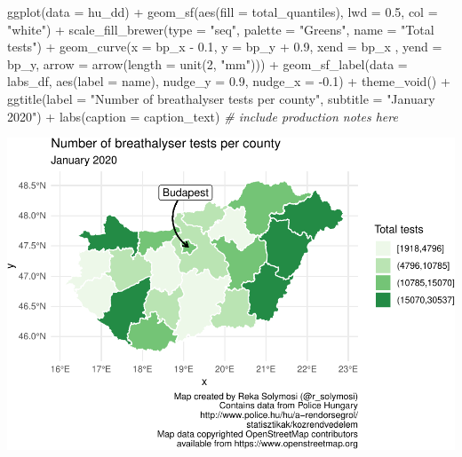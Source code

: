 \documentclass[
]{book}
\makeatletter
\newenvironment{Shaded}{\begin{snugshade}}{\end{snugshade}}
\newcommand{\AttributeTok}[1]{\textcolor[rgb]{0.61,0.61,0.61}{#1}}
\newcommand{\CommentTok}[1]{\textcolor[rgb]{0.37,0.37,0.37}{\textit{#1}}}
\newcommand{\DecValTok}[1]{\textcolor[rgb]{0.06,0.06,0.06}{#1}}
\newcommand{\FloatTok}[1]{\textcolor[rgb]{0.06,0.06,0.06}{#1}}
\newcommand{\FunctionTok}[1]{\textcolor[rgb]{0,0,0}{#1}}
\newcommand{\NormalTok}[1]{#1}
\newcommand{\SpecialCharTok}[1]{\textcolor[rgb]{0,0,0}{#1}}
\newcommand{\StringTok}[1]{\textcolor[rgb]{0.5,0.5,0.5}{#1}}
\newenvironment{kframe}{%
\medskip{}
\setlength{\fboxsep}{.8em}
 \def\at@end@of@kframe{}%
 \ifinner\ifhmode%
  \def\at@end@of@kframe{\end{minipage}}%
  \begin{minipage}{\columnwidth}%
 \fi\fi%
 \def\FrameCommand##1{\hskip\@totalleftmargin \hskip-\fboxsep
 \colorbox{shadecolor}{##1}\hskip-\fboxsep
     \hskip-\linewidth \hskip-\@totalleftmargin \hskip\columnwidth}%
 \MakeFramed {\advance\hsize-\width
   \@totalleftmargin\z@ \linewidth\hsize
   \@setminipage}}%
 {\par\unskip\endMakeFramed%
 \at@end@of@kframe}
\renewenvironment{Shaded}{\begin{kframe}}{\end{kframe}}
\makeatother
\begin{document}
\begin{Shaded}
\begin{Highlighting}[]
\FunctionTok{ggplot}\NormalTok{(}\AttributeTok{data =}\NormalTok{ hu\_dd) }\SpecialCharTok{+} 
  \FunctionTok{geom\_sf}\NormalTok{(}\FunctionTok{aes}\NormalTok{(}\AttributeTok{fill =}\NormalTok{ total\_quantiles), }
          \AttributeTok{lwd =} \FloatTok{0.5}\NormalTok{, }\AttributeTok{col =} \StringTok{"white"}\NormalTok{) }\SpecialCharTok{+} 
  \FunctionTok{scale\_fill\_brewer}\NormalTok{(}\AttributeTok{type =} \StringTok{"seq"}\NormalTok{, }
                    \AttributeTok{palette =} \StringTok{"Greens"}\NormalTok{, }
                    \AttributeTok{name =} \StringTok{"Total tests"}\NormalTok{) }\SpecialCharTok{+} 
  \FunctionTok{geom\_curve}\NormalTok{(}\AttributeTok{x =}\NormalTok{ bp\_x }\SpecialCharTok{{-}} \FloatTok{0.1}\NormalTok{, }
             \AttributeTok{y =}\NormalTok{ bp\_y }\SpecialCharTok{+} \FloatTok{0.9}\NormalTok{, }
             \AttributeTok{xend =}\NormalTok{ bp\_x , }
             \AttributeTok{yend =}\NormalTok{ bp\_y, }
             \AttributeTok{arrow =} \FunctionTok{arrow}\NormalTok{(}\AttributeTok{length =} \FunctionTok{unit}\NormalTok{(}\DecValTok{2}\NormalTok{, }\StringTok{"mm"}\NormalTok{))) }\SpecialCharTok{+}
  \FunctionTok{geom\_sf\_label}\NormalTok{(}\AttributeTok{data =}\NormalTok{ labs\_df, }
                \FunctionTok{aes}\NormalTok{(}\AttributeTok{label =}\NormalTok{ name), }
                \AttributeTok{nudge\_y =} \FloatTok{0.9}\NormalTok{, }
                \AttributeTok{nudge\_x =} \SpecialCharTok{{-}}\FloatTok{0.1}\NormalTok{) }\SpecialCharTok{+} 
  \FunctionTok{theme\_void}\NormalTok{() }\SpecialCharTok{+} 
  \FunctionTok{ggtitle}\NormalTok{(}\AttributeTok{label =} \StringTok{"Number of breathalyser tests per county"}\NormalTok{, }
          \AttributeTok{subtitle =} \StringTok{"January 2020"}\NormalTok{) }\SpecialCharTok{+} 
  \FunctionTok{labs}\NormalTok{(}\AttributeTok{caption =}\NormalTok{ caption\_text) }\CommentTok{\# include production notes here}
\end{Highlighting}
\end{Shaded}

\includegraphics{crime_mapping_files/figure-latex/unnamed-chunk-164-1.pdf}
\end{document}
